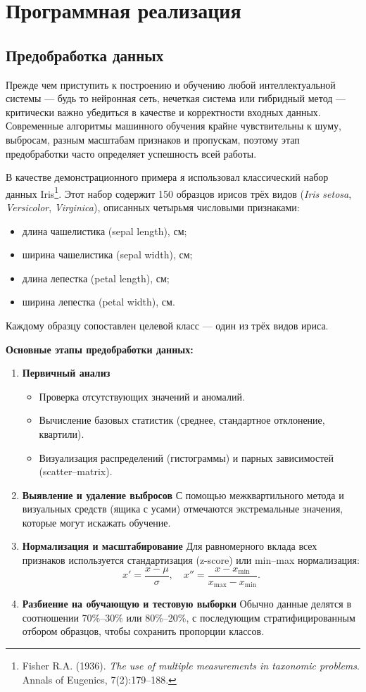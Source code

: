 \section{Программная реализация}

\subsection{Предобработка данных}

Прежде чем приступить к построению и обучению любой интеллектуальной системы — будь то нейронная сеть, нечеткая система или гибридный метод — критически важно убедиться в качестве и корректности входных данных. Современные алгоритмы машинного обучения крайне чувствительны к шуму, выбросам, разным масштабам признаков и пропускам, поэтому этап предобработки часто определяет успешность всей работы.

В качестве демонстрационного примера я использовал классический набор данных Iris\footnote{Fisher R.A. (1936). \emph{The use of multiple measurements in taxonomic problems}. Annals of Eugenics, 7(2):179–188.}. Этот набор содержит 150 образцов ирисов трёх видов (\emph{Iris setosa}, \emph{Versicolor}, \emph{Virginica}), описанных четырьмя числовыми признаками:
\begin{itemize}
  \item длина чашелистика (sepal length), см;
  \item ширина чашелистика (sepal width), см;
  \item длина лепестка (petal length), см;
  \item ширина лепестка (petal width), см.
\end{itemize}
Каждому образцу сопоставлен целевой класс — один из трёх видов ириса.

\medskip
\noindent\textbf{Основные этапы предобработки данных:}
\begin{enumerate}
  \item \textbf{Первичный анализ}  
    \begin{itemize}
      \item Проверка отсутствующих значений и аномалий.
      \item Вычисление базовых статистик (среднее, стандартное отклонение, квартили).
      \item Визуализация распределений (гистограммы) и парных зависимостей (scatter–matrix).
    \end{itemize}
  \item \textbf{Выявление и удаление выбросов}  
    С помощью межквартильного метода и визуальных средств (ящика с усами) отмечаются экстремальные значения, которые могут искажать обучение.
  \item \textbf{Нормализация и масштабирование}  
    Для равномерного вклада всех признаков используется стандартизация (z-score) или min–max нормализация:
    \[
      x' = \frac{x - \mu}{\sigma},\quad
      x'' = \frac{x - x_{\min}}{x_{\max}-x_{\min}}.
    \]
  \item \textbf{Разбиение на обучающую и тестовую выборки}  
    Обычно данные делятся в соотношении 70\%–30\% или 80\%–20\%, с последующим стратифицированным отбором образцов, чтобы сохранить пропорции классов.
\end{enumerate}

